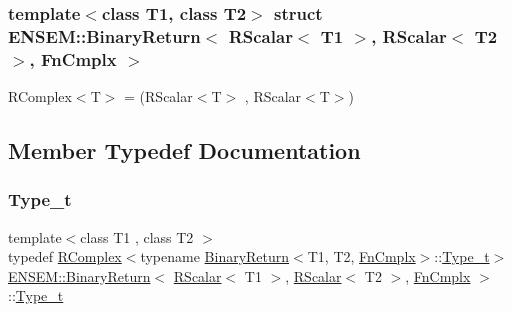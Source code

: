 \subsubsection*{template$<$class T1, class T2$>$\newline
struct E\+N\+S\+E\+M\+::\+Binary\+Return$<$ R\+Scalar$<$ T1 $>$, R\+Scalar$<$ T2 $>$, Fn\+Cmplx $>$}

R\+Complex$<$\+T$>$ = (R\+Scalar$<$\+T$>$ , R\+Scalar$<$\+T$>$) 

\subsection{Member Typedef Documentation}
\mbox{\label{structENSEM_1_1BinaryReturn_3_01RScalar_3_01T1_01_4_00_01RScalar_3_01T2_01_4_00_01FnCmplx_01_4_a478f881e6acca67db287ec50e606ace1}} 
\subsubsection{\texorpdfstring{Type\_t}{Type\_t}\hspace{0.1cm}{\footnotesize\ttfamily [1/2]}}
{\footnotesize\ttfamily template$<$class T1 , class T2 $>$ \\
typedef \mbox{\hyperlink{classENSEM_1_1RComplex}{R\+Complex}}$<$typename \mbox{\hyperlink{structENSEM_1_1BinaryReturn}{Binary\+Return}}$<$T1, T2, \mbox{\hyperlink{structENSEM_1_1FnCmplx}{Fn\+Cmplx}}$>$\+::\mbox{\hyperlink{structENSEM_1_1BinaryReturn_3_01RScalar_3_01T1_01_4_00_01RScalar_3_01T2_01_4_00_01FnCmplx_01_4_a478f881e6acca67db287ec50e606ace1}{Type\+\_\+t}}$>$ \mbox{\hyperlink{structENSEM_1_1BinaryReturn}{E\+N\+S\+E\+M\+::\+Binary\+Return}}$<$ \mbox{\hyperlink{classENSEM_1_1RScalar}{R\+Scalar}}$<$ T1 $>$, \mbox{\hyperlink{classENSEM_1_1RScalar}{R\+Scalar}}$<$ T2 $>$, \mbox{\hyperlink{structENSEM_1_1FnCmplx}{Fn\+Cmplx}} $>$\+::\mbox{\hyperlink{structENSEM_1_1BinaryReturn_3_01RScalar_3_01T1_01_4_00_01RScalar_3_01T2_01_4_00_01FnCmplx_01_4_a478f881e6acca67db287ec50e606ace1}{Type\+\_\+t}}}

\mbox{\label{structENSEM_1_1BinaryReturn_3_01RScalar_3_01T1_01_4_00_01RScalar_3_01T2_01_4_00_01FnCmplx_01_4_a478f881e6acca67db287ec50e606ace1}} 
